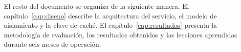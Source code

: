 El resto del documento se organiza de la siguiente manera. El
capítulo~\ref{cap:diseno} describe la arquitectura del servicio, el modelo de
aislamiento y la clave de caché. El capítulo~\ref{cap:resultados} presenta la
metodología de evaluación, los resultados obtenidos y las lecciones
aprendidas durante seis meses de operación.
